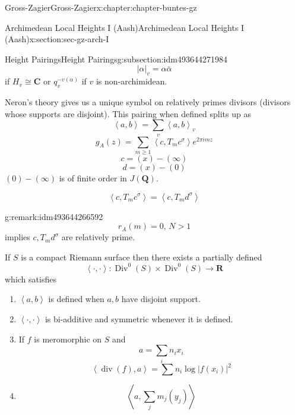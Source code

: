 \documentclass[oneside,10pt,]{book}
\numberwithin{equation}{section}
\newcommand{\pair}[2]{\left\langle #1, #2 \right\rangle}
\newcommand{\QQ}{\mathbf{Q}}
\newcommand{\RR}{\mathbf{R}}
\newcommand{\CC}{\mathbf{C}}
\DeclareMathOperator{\divisor}{div}
\DeclareMathOperator{\Div}{Div}
\newcommand{\gt}{>}
\begin{document}
\begin{chapterptx}{Gross-Zagier}{}{Gross-Zagier}{}{}{x:chapter:chapter-buntes-gz}
\begin{sectionptx}{Archimedean Local Heights I (Aash)}{}{Archimedean Local Heights I (Aash)}{}{}{x:section:sec-gz-arch-I}
\begin{subsectionptx}{Height Pairings}{}{Height Pairings}{}{}{g:subsection:idm493644271984}
\begin{equation*}
|\alpha |_v = \alpha \bar \alpha
\end{equation*}
if \(H_v \cong \CC\) or \(q_v^{-v(\alpha )}\) if \(v\) is non-archimidean.%
\par
Neron's theory gives us a unique symbol on relatively primes divisors (divisors whose supports are disjoint). This pairing when defined splits up as%
\begin{equation*}
\pair ab = \sum_v \pair ab_v
\end{equation*}
%
\begin{equation*}
g_A(z) = \sum_{m\ge1} \pair c{ T_m c^\sigma } e^{2\pi  i m z}
\end{equation*}
%
\begin{equation*}
c=(x) - (\infty )
\end{equation*}
%
\begin{equation*}
d = (x) - (0)
\end{equation*}
\((0)-(\infty )\) is of finite order in \(J(\QQ)\).%
\par
%
\begin{equation*}
\pair c{T_m c^\sigma } = \pair c {T_m d^\sigma }
\end{equation*}
%
\begin{remark}{}{g:remark:idm493644266592}%
%
\begin{equation*}
r_A(m) = 0,\, N \gt1
\end{equation*}
implies \(c,T_m d^\sigma\)  are relatively prime.%
\end{remark}
If \(S\) is a compact Riemann surface then there exists a partially defined%
\begin{equation*}
\pair \cdot \cdot \colon  \Div^0(S) \times \Div^0(S) \to \RR
\end{equation*}
which satisfies%
\begin{enumerate}
\item{}\(\pair ab\) is defined when \(a,b\) have disjoint support.%
\item{}\(\pair \cdot\cdot\) is bi-additive and symmetric whenever it is defined.%
\item{}If \(f\) is meromorphic on \(S\) and%
\begin{equation*}
a= \sum_i n_i x_i
\end{equation*}
%
\begin{equation*}
\pair{\divisor (f)} a = \sum n_i \log|f(x_i)|^2
\end{equation*}
%
\item{}%
\begin{equation*}
\pair a {\sum_j m_j (y_j)}

\end{equation*}
\end{enumerate}
\end{subsectionptx}
\end{sectionptx}
\end{chapterptx}
\end{document}
